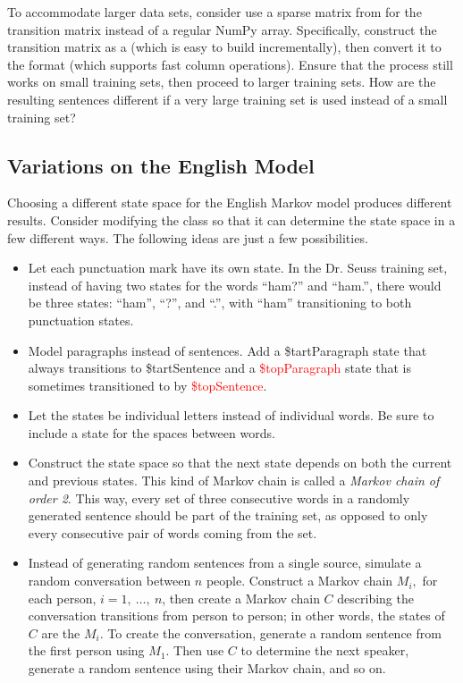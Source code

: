 To accommodate larger data sets, consider use a sparse matrix from  for the transition matrix instead of a regular NumPy array.
Specifically, construct the transition matrix as a  (which is easy to build incrementally), then convert it to the  format (which supports fast column operations).
Ensure that the process still works on small training sets, then proceed to larger training sets.
How are the resulting sentences different if a very large training set is used instead of a small training set?

\subsection*{Variations on the English Model} %

Choosing a different state space for the English Markov model produces different results.
Consider modifying the  class so that it can determine the state space in a few different ways.
The following ideas are just a few possibilities.

\begin{itemize}
\item Let each punctuation mark have its own state.
In the Dr. Seuss training set, instead of having two states for the words ``ham?'' and ``ham.'', there would be three states: ``ham'', ``?'', and ``.'', with ``ham'' transitioning to both punctuation states.

\item Model paragraphs instead of sentences.
Add a \textcolor[rgb]{0,.6,0}{\$tartParagraph} state that always transitions to \textcolor[rgb]{0,.6,0}{\$tartSentence} and a \textcolor{red}{\$topParagraph} state that is sometimes transitioned to by \textcolor{red}{\$topSentence}.

\item Let the states be individual letters instead of individual words.
Be sure to include a state for the spaces between words.

\item Construct the state space so that the next state depends on both the current and previous states.
This kind of Markov chain is called a \emph{Markov chain of order 2}.
This way, every set of three consecutive words in a randomly generated sentence should be part of the training set, as opposed to only every consecutive pair of words coming from the set.

\item Instead of generating random sentences from a single source, simulate a random conversation between $n$ people.
Construct a Markov chain $M_i,$ for each person, $i=1,\ \ldots,\ n$, then create a Markov chain $C$ describing the conversation transitions from person to person; in other words, the states of $C$ are the $M_i$.
To create the conversation, generate a random sentence from the first person using $M_1$.
Then use $C$ to determine the next speaker, generate a random sentence using their Markov chain, and so on.
\end{itemize}

